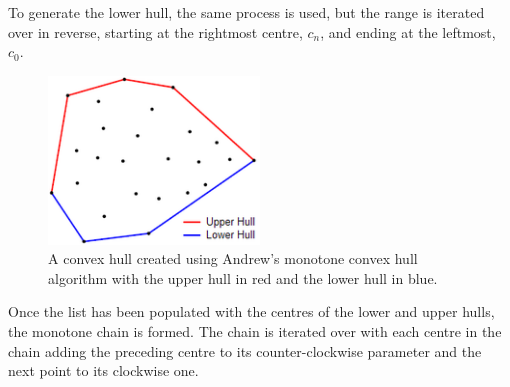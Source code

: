 \\
\\
To generate the lower hull, the same process is used, but the range is iterated over in reverse, starting at the rightmost centre, $c_n$, and ending at the leftmost, $c_0$.
\begin{figure}[H]
\centering
\includegraphics[width=0.5\textwidth]{Images/andrewmonotone.png}
\caption[]{A convex hull created using Andrew's monotone convex hull algorithm with the upper hull in red and the lower hull in blue\footnotemark.}
\label{fig:andrewmonotone}
\end{figure}
Once the list has been populated with the centres of the lower and upper hulls, the monotone chain is formed. The chain is iterated over with each centre in the chain adding the preceding centre to its counter-clockwise parameter and the next point to its clockwise one.

